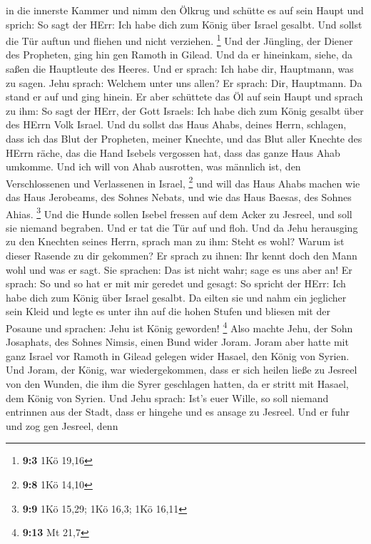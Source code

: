 in die innerste Kammer  und nimm den Ölkrug und schütte es
auf sein Haupt und sprich: So sagt der HErr: Ich habe dich zum König
über Israel gesalbt. Und sollst die Tür auftun und fliehen und nicht
verziehen. \footnote{\textbf{9:3} 1Kö 19,16}  Und der
Jüngling, der Diener des Propheten, ging hin gen Ramoth in Gilead.
 Und da er hineinkam, siehe, da saßen die Hauptleute des
Heeres. Und er sprach: Ich habe dir, Hauptmann, was zu sagen. Jehu
sprach: Welchem unter uns allen? Er sprach: Dir, Hauptmann. 
Da stand er auf und ging hinein. Er aber schüttete das Öl auf sein Haupt
und sprach zu ihm: So sagt der HErr, der Gott Israels: Ich habe dich zum
König gesalbt über des HErrn Volk Israel.  Und du sollst das
Haus Ahabs, deines Herrn, schlagen, dass ich das Blut der Propheten,
meiner Knechte, und das Blut aller Knechte des HErrn räche, das die Hand
Isebels vergossen hat,  dass das ganze Haus Ahab umkomme.
Und ich will von Ahab ausrotten, was männlich ist, den Verschlossenen
und Verlassenen in Israel, \footnote{\textbf{9:8} 1Kö 14,10}
 und will das Haus Ahabs machen wie das Haus Jerobeams, des
Sohnes Nebats, und wie das Haus Baesas, des Sohnes Ahias. \footnote{\textbf{9:9}
  1Kö 15,29; 1Kö 16,3; 1Kö 16,11}  Und die Hunde sollen
Isebel fressen auf dem Acker zu Jesreel, und soll sie niemand begraben.
Und er tat die Tür auf und floh.  Und da Jehu herausging zu
den Knechten seines Herrn, sprach man zu ihm: Steht es wohl? Warum ist
dieser Rasende zu dir gekommen? Er sprach zu ihnen: Ihr kennt doch den
Mann wohl und was er sagt.  Sie sprachen: Das ist nicht
wahr; sage es uns aber an! Er sprach: So und so hat er mit mir geredet
und gesagt: So spricht der HErr: Ich habe dich zum König über Israel
gesalbt.  Da eilten sie und nahm ein jeglicher sein Kleid
und legte es unter ihn auf die hohen Stufen und bliesen mit der Posaune
und sprachen: Jehu ist König geworden! \footnote{\textbf{9:13} Mt 21,7}
 Also machte Jehu, der Sohn Josaphats, des Sohnes Nimsis,
einen Bund wider Joram. Joram aber hatte mit ganz Israel vor Ramoth in
Gilead gelegen wider Hasael, den König von Syrien.  Und
Joram, der König, war wiedergekommen, dass er sich heilen ließe zu
Jesreel von den Wunden, die ihm die Syrer geschlagen hatten, da er
stritt mit Hasael, dem König von Syrien. Und Jehu sprach: Ist's euer
Wille, so soll niemand entrinnen aus der Stadt, dass er hingehe und es
ansage zu Jesreel.  Und er fuhr und zog gen Jesreel, denn
